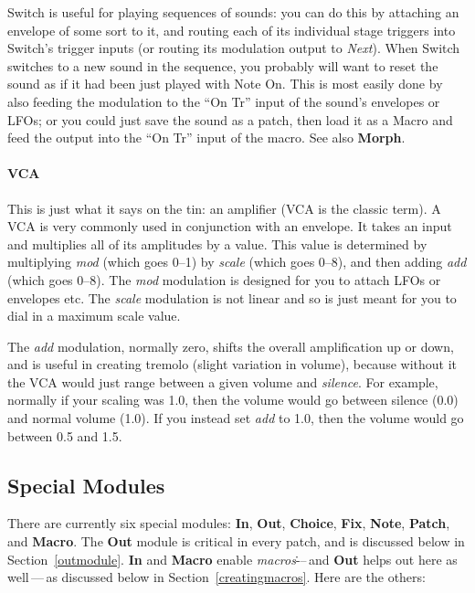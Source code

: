\documentclass{article}
\begin{document}
Switch is useful for playing sequences of sounds: you can do this by attaching an envelope of some sort to it, and routing each of its individual stage triggers into Switch's trigger inputs (or routing its modulation output to {\it Next}).   When Switch switches to a new sound in the sequence, you probably will want to reset the sound as if it had been just played with Note On.  This is most easily done by also feeding the modulation to the ``On Tr'' input of the sound's envelopes or LFOs; or you could just save the sound as a patch, then load it as a Macro and feed the output into the ``On Tr'' input of the macro.   See also {\bf Morph}.

\paragraph{VCA} This is just what it says on the tin: an amplifier (VCA is the classic term).  A VCA is very commonly used in conjunction with an envelope.  It takes an input and multiplies all of its amplitudes by a value.  This value is determined by multiplying {\it mod} (which goes 0--1) by {\it scale} (which goes 0--8), and then adding {\it add} (which goes 0--8).  The {\it mod} modulation is designed for you to attach LFOs or envelopes etc.  The {\it scale} modulation is not linear and so is just meant for you to dial in a maximum scale value.   

The {\it add} modulation, normally zero, shifts the overall amplification up or down, and is useful in creating tremolo (slight variation in volume), because without it the VCA would just range between a given volume and {\it silence}. For example, normally if your scaling was 1.0, then the volume would go between silence (0.0) and normal volume (1.0).  If you instead set {\it add} to 1.0, then the volume would go between 0.5 and 1.5.

\subsection{Special Modules}
\label{specialmodules}

There are currently six special modules: {\bf In}, {\bf Out}, {\bf Choice}, {\bf Fix}, {\bf Note}, {\bf Patch}, and {\bf Macro}.  The {\bf Out} module is critical in every patch, and is discussed below in Section~\ref{outmodule}.  {\bf In} and {\bf Macro} enable {\it macros}\.---\,and {\bf Out} helps out here as well\,---\,as discussed below in Section~\ref{creatingmacros}.  Here are the others:
\end{document}

